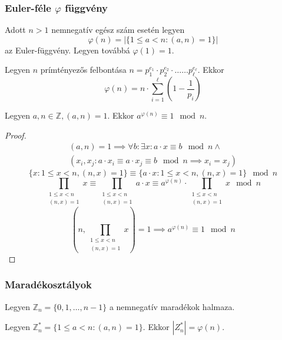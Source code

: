 \subsubsection{Euler-féle $\varphi$ függvény}
\begin{definition}
	Adott $n > 1$ nemnegatív egész szám esetén legyen
	\begin{equation*}
		\varphi(n) = |\{ 1 \leq a < n: (a, n) = 1 \}|
	\end{equation*}
	 az Euler-függvény. Legyen továbbá $\varphi(1) = 1$.
\end{definition}
\begin{theorem}
	Legyen $n$ prímtényezős felbontása
	$n = p_1^{e_1} \cdot p_2^{e_2} \cdot \dots \dots p_\ell^{e_\ell}$. Ekkor
	\begin{equation*}
		\varphi(n) =
		n \cdot \sum_{i = 1}^{\ell} \left( 1 - \frac{1}{p_i} \right)
	\end{equation*}
\end{theorem}
\begin{theorem}
	Legyen $a, n \in \mathbb{Z}, (a, n) = 1$.
	Ekkor $a^{\varphi(n)} \equiv 1 \mod n$.
\end{theorem}
\begin{proof}
	\begin{multline*}
		(a, n) = 1 \implies
		\forall b: \exists x: a \cdot x \equiv b \mod n \land \\
		(x_i, x_j: a \cdot x_i \equiv a \cdot x_j \equiv b \mod n \implies
		x_i = x_j)
	\end{multline*}
	\begin{equation*}
		\{ x: 1 \leq x < n, (n, x) = 1 \} \equiv
		\{ a \cdot x: 1 \leq x < n, (n, x) = 1 \} \mod n
	\end{equation*}
	\begin{equation*}
		\prod_{\substack{1 \leq x < n \\ (n, x) = 1}} x \equiv
		\prod_{\substack{1 \leq x < n \\ (n, x) = 1}} a \cdot x \equiv
		a^{\varphi(n)} \cdot
		\prod_{\substack{1 \leq x < n \\ (n, x) = 1}} x \mod n
	\end{equation*}
	\begin{equation*}
		\left( n, \prod_{\substack{1 \leq x < n \\ (n, x) = 1}} x \right) =
		1 \implies a^{\varphi(n)} \equiv 1 \mod n
	\end{equation*}
\end{proof}
\subsubsection{Maradékosztályok}
\begin{definition}
	Legyen $\mathbb{Z}_n = \{ 0, 1, \dots, n - 1 \}$
	a nemnegatív maradékok halmaza.
\end{definition}
\begin{definition}
	Legyen $\mathbb{Z}_n^* = \{ 1 \leq a < n: (a, n) = 1\}$.
	Ekkor $|Z_n^*| = \varphi(n)$.
\end{definition}
